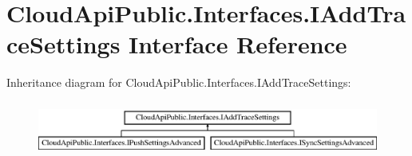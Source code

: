 \hypertarget{interface_cloud_api_public_1_1_interfaces_1_1_i_add_trace_settings}{\section{Cloud\-Api\-Public.\-Interfaces.\-I\-Add\-Trace\-Settings Interface Reference}
\label{interface_cloud_api_public_1_1_interfaces_1_1_i_add_trace_settings}
}
Inheritance diagram for Cloud\-Api\-Public.\-Interfaces.\-I\-Add\-Trace\-Settings\-:\begin{figure}[H]
\begin{center}
\leavevmode
\includegraphics[height=1.836066cm]{interface_cloud_api_public_1_1_interfaces_1_1_i_add_trace_settings}
\end{center}
\end{figure}
